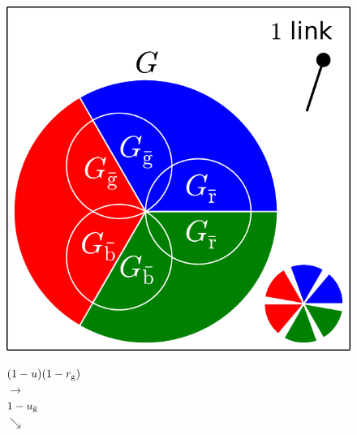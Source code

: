 \documentclass[aps, pre, onecolumn, a4paper, floatfix]{revtex4}
\begin{document}
\begin{figure}[htb]
  \begin{minipage}[b]{0.22\linewidth}
    \begin{center}
    \includegraphics[width=0.99\columnwidth]{sets_1_all.pdf}\\
      \vspace{50mm}
   \end{center}
  \end{minipage}
  \begin{minipage}[b]{0.15\linewidth}
    \begin{center}
      $(1-u)(1-r_{\rm g})$\\
      {\Large $\rightarrow$\\}
      \vspace{20mm}
      $1-u_{\bar{\rm g}}$\\
      {\Large $\searrow$\\}
      \vspace{35mm}
    \end{center}
  \end{minipage}
  \begin{minipage}[b]{0.22\linewidth}
    \begin{center}

\end{center}
\end{minipage}
\end{figure}
\end{document}
